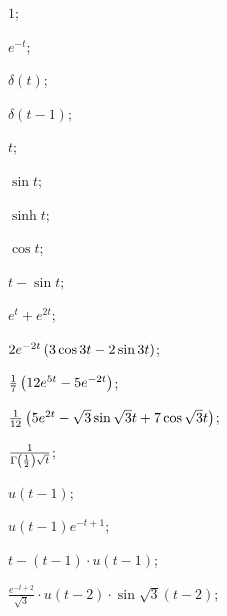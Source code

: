 	\begin{enumsols}

		\item \( 1 \); \sfill %
		\item \( e^{-t} \); \sfill %
		\item \( \delta(t) \); \sfill %
		\item \( \delta(t-1) \); \sfill %
		\item \( t \); \sfill %
		\item \( \sin{t} \); \sfill %
		\item \( \sinh{t} \); \sfill %
		\item \( \cos{t} \); \sfill %
		\item \( t - \sin{t} \); \sfill %
		\item \( e^t + e^{2t} \); \sfill %
		\item \( 2e^{-2t} \left( 3 \cos{3t} - 2 \sin{3t} \right) \); \sfill %
		\item \( \frac{1}{7} \left( 12e^{5t} -  5e^{-2t} \right) \); \sfill %
		\item \( \frac{1}{12} \left( 5e^{2t} - \sqrt{3} \sin{\sqrt{3}t} + 7 \cos{\sqrt{3}t} \right) \); \sfill %
		\item \( \frac{1}{\Gamma\left( \frac{1}{2} \right) \sqrt{t}} \); \sfill %

		\item \( u(t-1) \); \sfill %
		\item \( u(t-1) e^{-t + 1} \); \sfill %
		\item \( t - (t-1) \cdot u(t-1) \); \sfill %
		\item \( \frac{e^{-t+2}}{\sqrt{3}} \cdot u(t-2) \cdot \sin{\sqrt{3}(t-2)} \); \sfill %


\end{enumsols}
